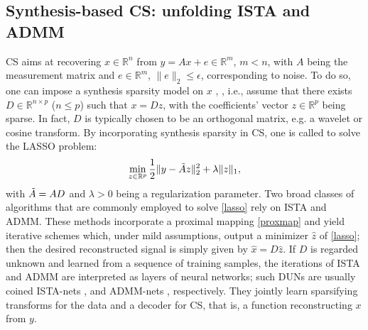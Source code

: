 \documentclass[preprint,12pt]{elsarticle}
\newcommand{\rn}{\mathbb{R}^n}
\newcommand{\st}{\mathcal{S}}\newcommand{\sgn}{\mathrm{sign}}
\newcommand{\opnorm}{2\rightarrow2}
\begin{document}
\subsection{Synthesis-based CS: unfolding ISTA and ADMM}
CS aims at recovering $x\in\rn$ from $y=Ax+e\in\mathbb{R}^m$, $m<n$, with $A$ being the measurement matrix and $e\in\mathbb{R}^m$, $\|e\|_2\leq\epsilon$, corresponding to noise. To do so, one can impose a synthesis sparsity model on $x$ \cite{rf}, \cite{waveletcs}, i.e., assume that there exists $D\in\mathbb{R}^{n\times p}$ ($n\leq p$) such that $x=Dz$, with the coefficients' vector $z\in\mathbb{R}^p$ being sparse. In fact, $D$ is typically chosen to be an orthogonal matrix, e.g. a wavelet or cosine transform. By incorporating synthesis sparsity in CS, one is called to solve the LASSO problem:
\begin{equation}\label{lasso}
    \min_{z\in\mathbb{R}^p}\frac{1}{2}\|y-\Tilde{A}z\|_2^2+\lambda\|z\|_1,
\end{equation}
with $\Tilde{A}=AD$ and $\lambda>0$ being a regularization parameter. Two broad classes of algorithms that are commonly employed to solve \eqref{lasso} rely on ISTA and ADMM. These methods incorporate a proximal mapping \eqref{proxmap} and yield iterative schemes which, under mild assumptions, output a minimizer $\hat{z}$ of \eqref{lasso}; then the desired reconstructed signal is simply given by $\hat{x}=D\hat{z}$. If $D$ is regarded unknown and learned from a sequence of training samples, the iterations of ISTA and ADMM are interpreted as layers of neural networks; such DUNs are usually coined ISTA-nets \cite{istagen}, \cite{lista} and ADMM-nets \cite{admm-net, robustadmmnet}, respectively. They jointly learn sparsifying transforms for the data and a decoder for CS, that is, a function reconstructing $x$ from $y$.
\end{document}
